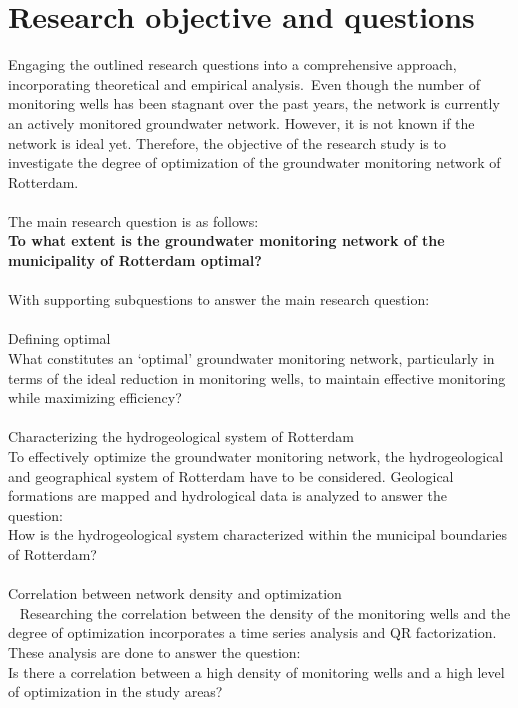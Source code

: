 \section{Research objective and questions}

Engaging the outlined research questions into a comprehensive approach, incorporating theoretical and empirical analysis. Even though the number of monitoring wells has been stagnant over the past years, the network is currently an actively monitored groundwater network. However, it is not known if the network is ideal yet. Therefore, the objective of the research study is to investigate the degree of optimization of the groundwater monitoring network of Rotterdam. \\
\\
The main research question is as follows:\\
\textbf{To what extent is the groundwater monitoring network of the municipality of Rotterdam optimal?}\\
\\
With supporting subquestions to answer the main research question:\\
\\
Defining optimal\\
What constitutes an ‘optimal’ groundwater monitoring network, particularly in terms of the ideal reduction in monitoring wells, to maintain effective monitoring while maximizing efficiency?\\
\\
Characterizing the hydrogeological system of Rotterdam\\
To effectively optimize the groundwater monitoring network, the hydrogeological and geographical system of Rotterdam have to be considered. Geological formations are mapped and hydrological data is analyzed to answer the question: 
\\
How is the hydrogeological system characterized within the municipal boundaries of Rotterdam?\\
\\
Correlation between network density and optimization\\ 
Researching the correlation between the density of the monitoring wells and the degree of optimization incorporates a time series analysis and QR factorization. These analysis are done to answer the question:
\\
Is there a correlation between a high density of monitoring wells and a high level of optimization in the study areas?\\
